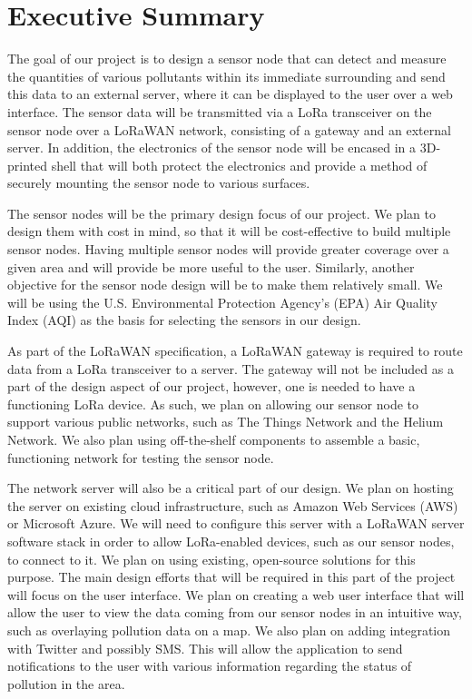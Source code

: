 \section{Executive Summary}
The goal of our project is to design a sensor node that can detect and measure the quantities of various pollutants within its immediate surrounding and send this data to an external server, where it can be displayed to the user over a web interface. The sensor data will be transmitted via a LoRa transceiver on the sensor node over a LoRaWAN network, consisting of a gateway and an external server. In addition, the electronics of the sensor node will be encased in a 3D-printed shell that will both protect the electronics and provide a method of securely mounting the sensor node to various surfaces.

The sensor nodes will be the primary design focus of our project. We plan to design them with cost in mind, so that it will be cost-effective to build multiple sensor nodes. Having multiple sensor nodes will provide greater coverage over a given area and will provide be more useful to the user. Similarly, another objective for the sensor node design will be to make them relatively small. We will be using the U.S. Environmental Protection Agency's (EPA) Air Quality Index (AQI) as the basis for selecting the sensors in our design. 

As part of the LoRaWAN specification, a LoRaWAN gateway is required to route data from a LoRa transceiver to a server. The gateway will not be included as a part of the design aspect of our project, however, one is needed to have a functioning LoRa device. As such, we plan on allowing our sensor node to support various public networks, such as The Things Network and the Helium Network. We also plan using off-the-shelf components to assemble a basic, functioning network for testing the sensor node.

The network server will also be a critical part of our design. We plan on hosting the server on existing cloud infrastructure, such as Amazon Web Services (AWS) or Microsoft Azure. We will need to configure this server with a LoRaWAN server software stack in order to allow LoRa-enabled devices, such as our sensor nodes, to connect to it. We plan on using existing, open-source solutions for this purpose. The main design efforts that will be required in this part of the project will focus on the user interface. We plan on creating a web user interface that will allow the user to view the data coming from our sensor nodes in an intuitive way, such as overlaying pollution data on a map. We also plan on adding integration with Twitter and possibly SMS. This will allow the application to send notifications to the user with various information regarding the status of pollution in the area.

